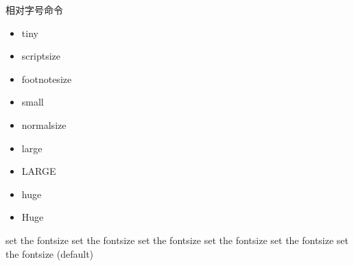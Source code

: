 \documentclass{ctexart}
\begin{document}


           
            相对字号命令
            \begin{itemize}
                \item \tiny tiny 
                \item \scriptsize scriptsize
                \item \footnotesize footnotesize
                \item \small small
                \item \normalsize normalsize %
                \item \large large
                \item \LARGE LARGE
                \item \huge huge
                \item \Huge Huge
            \end{itemize}

            set the fontsize set the fontsize set the fontsize set the fontsize set the fontsize set the fontsize (default)
\end{document}
